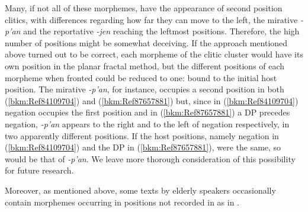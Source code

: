 \documentclass[output=paper]{langscibook}
\begin{document}
Many, if not all of these morphemes, have the appearance of second position clitics, with differences regarding how far they can move to the left, the mirative \textit{-p'an} and the reportative \textit{-jen} reaching the leftmost positions. Therefore, the high number of positions might be somewhat deceiving. If the approach mentioned above turned out to be correct, each morpheme of the clitic cluster would have its own position in the planar fractal method, but the different positions of each morpheme when fronted could be reduced to one: bound to the initial host position. The mirative \textit{-p'an}, for instance, occupies a second position in both (\ref{bkm:Ref84109704}) and (\ref{bkm:Ref87657881}) but, since in (\ref{bkm:Ref84109704}) negation occupies the first position and in (\ref{bkm:Ref87657881}) a DP precedes negation, \textit{-p'an} appears to the right and to the left of negation respectively, in two apparently different positions. If the host positions, namely negation in (\ref{bkm:Ref84109704}) and the DP in (\ref{bkm:Ref87657881}), were the same, so would be that of \textit{-p'an}. We leave more thorough consideration of this possibility for future research.

Moreover, as mentioned above, some texts by elderly speakers occasionally contain morphemes occurring in positions not recorded in  as in .
\end{document}
